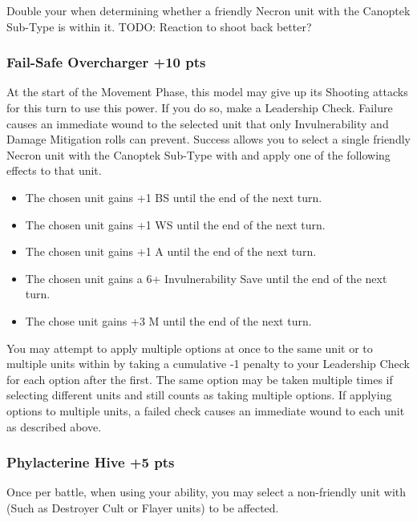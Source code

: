 Double your  when determining whether a friendly Necron unit with the Canoptek Sub-Type is within it. TODO: Reaction to shoot back better?

\subsubsection[Fail-Safe Overcharger ]{Fail-Safe Overcharger  \hrulefill +10 pts}

At the start of the Movement Phase, this model may give up its Shooting attacks for this turn to use this power. If you do so, make a Leadership Check. Failure causes an immediate wound to the selected unit that only Invulnerability and Damage Mitigation rolls can prevent. Success allows you to select a single friendly Necron unit with the Canoptek Sub-Type with  and apply one of the following effects to that unit.

\begin{itemize}
	\item The chosen unit gains +1 BS until the end of the next turn.
	\item The chosen unit gains +1 WS until the end of the next turn.
	\item The chosen unit gains +1 A until the end of the next turn.
	\item The chosen unit gains a 6+ Invulnerability Save until the end of the next turn.
	\item The chose unit gains +3 M until the end of the next turn.
\end{itemize}

You may attempt to apply multiple options at once to the same unit or to multiple units within  by taking a cumulative -1 penalty to your Leadership Check for each option after the first. The same option may be taken multiple times if selecting different units and still counts as taking multiple options. If applying options to multiple units, a failed check causes an immediate wound to each unit as described above.

\subsubsection[Phylacterine Hive ]{Phylacterine Hive  \hrulefill +5 pts}

Once per battle, when using your  ability, you may select a non-friendly unit with  (Such as Destroyer Cult or Flayer units) to be affected.

